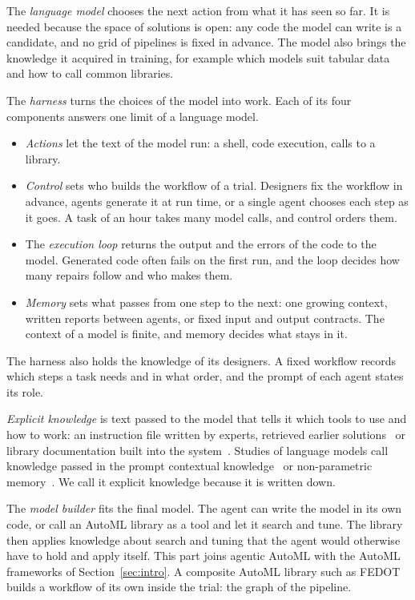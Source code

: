 The \emph{language model} chooses the next action from what it has seen so
far. It is needed because the space of solutions is open: any code the
model can write is a candidate, and no grid of pipelines is fixed in
advance. The model also brings the knowledge it acquired in training, for
example which models suit tabular data and how to call common libraries.

The \emph{harness} turns the choices of the model into work. Each of its
four components answers one limit of a language model.
\begin{itemize}
\setlength{\itemsep}{1pt}
\item \emph{Actions} let the text of the model run: a shell, code
  execution, calls to a library.
\item \emph{Control} sets who builds the workflow of a trial. Designers
  fix the workflow in advance, agents generate it at run time, or a single
  agent chooses each step as it goes. A task of an hour takes many model calls, and control orders
  them.
\item The \emph{execution loop} returns the output and the errors of the
  code to the model. Generated code often fails on the first run, and the
  loop decides how many repairs follow and who makes them.
\item \emph{Memory} sets what passes from one step to the next: one growing
  context, written reports between agents, or fixed input and output
  contracts. The context of a model is finite, and memory decides what
  stays in it.
\end{itemize}
The harness also holds the knowledge of its designers. A fixed workflow
records which steps a task needs and in what order, and the prompt of each
agent states its role.

\emph{Explicit knowledge} is text passed to the model that tells it which
tools to use and how to work: an instruction file written by experts,
retrieved earlier solutions~\citep{guo2024dsagent,kulibaba2025kompeteai} or
library documentation built into the system~\citep{fang2025mlzero}. Studies
of language models call knowledge passed in the prompt contextual
knowledge~\citep{xu2024conflicts} or non-parametric
memory~\citep{lewis2020rag}. We call it explicit knowledge because it is
written down.

The \emph{model builder} fits the final model. The agent can write the
model in its own code, or call an AutoML library as a tool and let it
search and tune. The library then applies knowledge about search and tuning
that the agent would otherwise have to hold and apply itself. This part joins agentic AutoML with the AutoML frameworks
of Section~\ref{sec:intro}. A composite AutoML library such as FEDOT
builds a workflow of its own inside the trial: the graph of the pipeline.

